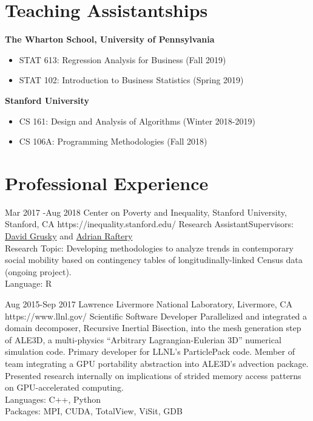 \documentclass[10pt]{article} %
\begin{document}
\section{Teaching Assistantships}
\textbf{The Wharton School, University of Pennsylvania}

\begin{itemize}
    \item[] STAT 613: Regression Analysis for Business (Fall 2019)
    \item[] STAT 102: Introduction to Business Statistics (Spring 2019)
\end{itemize}

\textbf{Stanford University}
\begin{itemize}
    \item[] CS 161: Design and Analysis of Algorithms (Winter 2018-2019)
    \item[] CS 106A: Programming Methodologies (Fall 2018)
\end{itemize}

\section{Professional Experience}

\job
{Mar 2017 -}{Aug 2018}
{Center on Poverty and Inequality, Stanford University, Stanford, CA}
{https://inequality.stanford.edu/}
{Research Assistant}{Supervisors: \href{https://sociology.stanford.edu/people/david-grusky}{David Grusky} and \href{https://www.stat.washington.edu/raftery/}{Adrian Raftery}\\[2pt]
Research Topic: Developing methodologies to analyze trends in contemporary social mobility based on contingency tables of longitudinally-linked Census data (ongoing project).\\[2pt]
Language: R}


\job
{Aug 2015-}{Sep 2017}
{Lawrence Livermore National Laboratory, Livermore, CA}
{https://www.llnl.gov/}
{Scientific Software Developer}
{Parallelized and integrated a domain decomposer, Recursive Inertial Bisection, into the mesh generation step of ALE3D, a multi-physics “Arbitrary Lagrangian-Eulerian 3D” numerical simulation code. Primary developer for LLNL’s ParticlePack code. Member of team integrating a GPU portability abstraction into ALE3D’s advection package. Presented research internally on implications of strided memory access patterns on GPU-accelerated computing.\\[2pt]
Languages: C++, Python \\[2pt]
Packages: MPI, CUDA, TotalView, ViSit, GDB}
\end{document}
